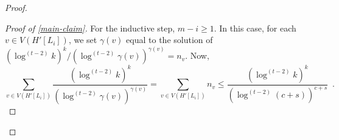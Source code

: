 \documentclass[kpfonts]{patmorin}
\theoremstyle{named}
\begin{document}
\begin{proof}
\begin{proof}[Proof of \cref{main-claim}]
        For the inductive step, $m-i\ge 1$.  In this case, for each $v\in V(H'[L_i])$, we set $\gamma(v)$ equal to the solution of $(\log^{(t-2)} k)^k/(\log^{(t-2)} \gamma(v))^{\gamma(v)} = n_v$. Now,
        \[
            \sum_{v\in V(H'[L_i])}\frac{(\log^{(t-2)} k)^k}{(\log^{(t-2)} \gamma(v))^{\gamma(v)}}
            = \sum_{v\in V(H'[L_i])} n_v
            \le \frac{(\log^{(t-2)} k)^k}{(\log^{(t-2)} (c+s))^{c+s}} \enspace .
        \]

\end{proof}
\end{proof}
\end{document}
